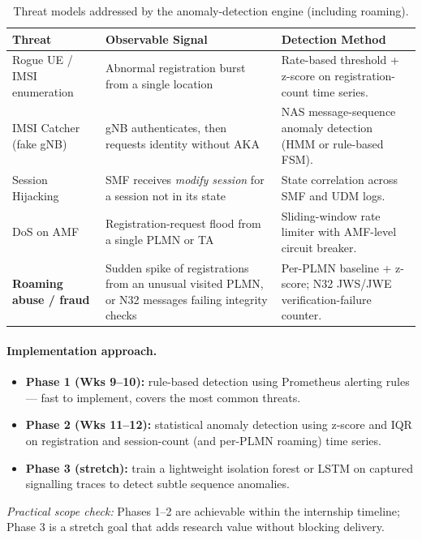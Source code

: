 \documentclass[11pt,a4paper]{report}
\begin{document}
\begin{table}[h]
\centering
\footnotesize
\renewcommand{\arraystretch}{1.3}
\begin{tabularx}{\linewidth}{@{}l X X@{}}
\toprule
\textbf{Threat} & \textbf{Observable Signal} & \textbf{Detection Method}\\
\midrule
Rogue UE / IMSI enumeration & Abnormal registration burst from a single location &
  Rate-based threshold + z-score on registration-count time series.\\
IMSI Catcher (fake gNB) & gNB authenticates, then requests identity without AKA &
  NAS message-sequence anomaly detection (HMM or rule-based FSM).\\
Session Hijacking & SMF receives \emph{modify session} for a session not in its state &
  State correlation across SMF and UDM logs.\\
DoS on AMF & Registration-request flood from a single PLMN or TA &
  Sliding-window rate limiter with AMF-level circuit breaker.\\
\textbf{Roaming abuse / fraud} & Sudden spike of registrations from an unusual visited PLMN,
  or N32 messages failing integrity checks &
  Per-PLMN baseline + z-score; N32 JWS/JWE verification-failure counter.\\
\bottomrule
\end{tabularx}
\caption{Threat models addressed by the anomaly-detection engine (including roaming).}
\label{tab:threats}
\end{table}

\paragraph{Implementation approach.}
\begin{itemize}[leftmargin=1.4em]
  \item \textbf{Phase 1 (Wks 9--10):} rule-based detection using Prometheus alerting rules
        --- fast to implement, covers the most common threats.
  \item \textbf{Phase 2 (Wks 11--12):} statistical anomaly detection using z-score and IQR
        on registration and session-count (and per-PLMN roaming) time series.
  \item \textbf{Phase 3 (stretch):} train a lightweight isolation forest or LSTM on captured
        signalling traces to detect subtle sequence anomalies.
\end{itemize}
\emph{Practical scope check:} Phases 1--2 are achievable within the internship timeline;
Phase 3 is a stretch goal that adds research value without blocking delivery.
\end{document}
